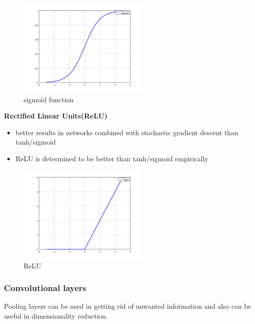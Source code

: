\begin{figure}[h]
	\begin{center}
		\includegraphics[width=240px,height=180px]{src/img/state/sigmoid}
		\caption{sigmoid function} \label{fig:sigmoid}
    \end{center}
\end{figure}

\textbf{Rectified Linear Units(ReLU)}
\begin{itemize}
	\item better results in networks combined with stochastic gradient descent than tanh/sigmoid\cite{imagenet}
	\item ReLU is determined to be better than tanh/sigmoid empirically
\end{itemize}

\begin{figure}[h]
	\begin{center}
		\includegraphics[width=240px,height=180px]{src/img/state/relu}
		\caption{ReLU} \label{fig:relu}
    \end{center}
\end{figure}

\newpage
\subsubsection{Convolutional layers}
Pooling layers can be used in getting rid of unwanted information and also can be useful in dimensionality reduction.

